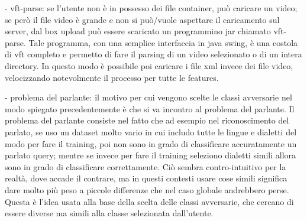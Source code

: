 - vft-parse:
 se l'utente non è in possesso dei file container, può caricare un video; se però il file video è grande e non si può/vuole aspettare il caricamento sul server, dal box upload può essere scaricato un programmino jar chiamato vft-parse. Tale programma, con una semplice interfaccia in java swing, è una costola di vft completo e permetto di fare il parsing di un video selezionato o di un intera directory. In questo modo è possibile poi caricare i file xml invece dei file video, velocizzando notevolmente il processo per tutte le features.

- problema del parlante:
 il motivo per cui vengono scelte le classi avversarie nel modo spiegato precedentemente è che si va incontro al problema del parlante. Il problema del parlante consiste nel fatto che ad esempio nel riconoscimento del parlato, se uso un dataset molto vario in cui includo tutte le lingue e dialetti del modo per fare il training, poi non sono in grado di classificare accuratamente un parlato query; mentre se invece per fare il training seleziono dialetti simili allora sono in grado di classificare correttamente. Ciò sembra contro-intuitivo per la realtà, dove accade il contrare, ma in questi contesti usare cose simili significa dare molto più peso a piccole differenze che nel caso globale andrebbero perse. Questa è l'idea usata alla base della scelta delle classi avversarie, che cercano di essere diverse ma simili alla classe selezionata dall'utente.

